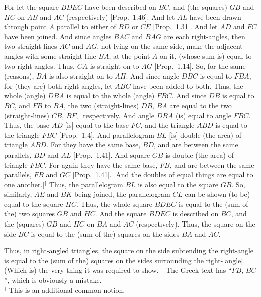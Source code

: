 For let the square $BDEC$ have been described on $BC$, and (the squares) $GB$ and $HC$ on $AB$ and $AC$ (respectively) [Prop.~1.46]. And let $AL$ have been drawn through point $A$ parallel to either of $BD$ or $CE$ [Prop.~1.31]. And let $AD$ and $FC$ have been joined. And
since angles $BAC$ and $BAG$ are each right-angles, then two straight-lines $AC$ and $AG$, not lying on the same side,
make the adjacent angles with some straight-line $BA$, at the point
$A$ on it, (whose sum is) equal to two right-angles. Thus, $CA$ is straight-on to $AG$ [Prop.~1.14]. So, for
the same (reasons), $BA$ is also straight-on to $AH$. And since angle $DBC$ is
equal to $FBA$, for (they are) both right-angles, let $ABC$ have been added to
both.  Thus, the whole (angle) $DBA$ is equal to the whole (angle) $FBC$.
And since $DB$ is equal to $BC$, and $FB$ to $BA$, the two (straight-lines) $DB$,
$BA$ are equal to the two (straight-lines) $CB$, $BF$,$^\dag$ respectively. And angle $DBA$ (is) equal to angle $FBC$. Thus, the base $AD$ [is] equal to the base $FC$,
and the triangle $ABD$ is equal to the triangle $FBC$ [Prop.~1.4]. And 
parallelogram $BL$ [is] double (the area) of triangle $ABD$. For they
have the same base, $BD$, and are between the same parallels, $BD$ and $AL$  [Prop.~1.41]. And
 square
$GB$ is double (the area) of triangle $FBC$. For again they have the same base, $FB$, and
are between the same parallels,
$FB$ and $GC$ [Prop.~1.41]. [And the doubles of equal things
are equal to one another.]$^\ddag$ Thus, the parallelogram $BL$ is also equal to the square $GB$. So, similarly, $AE$ and $BK$ being joined, 
the parallelogram $CL$ can be shown (to be)  equal to the square $HC$. Thus, the whole square
$BDEC$ is equal to the (sum of the) two squares $GB$ and $HC$. And the square $BDEC$
is described on $BC$, and the (squares) $GB$ and $HC$ on $BA$ and $AC$ (respectively). Thus, the square on the side $BC$ is equal to the
(sum of the) squares
on the sides $BA$ and $AC$.

\epsfysize=3.5in
\centerline{}

Thus, in right-angled triangles,  the square on the side subtending the right-angle
is equal to the (sum of the) squares on the sides surrounding the right-[angle].
(Which is) the very thing it was required to show.
{\footnotesize \noindent$^\dag$ The
Greek text has ``$FB$, $BC$'', which is obviously a mistake.\\[0.5ex]
$^\ddag$ This is an additional common notion.}\\

